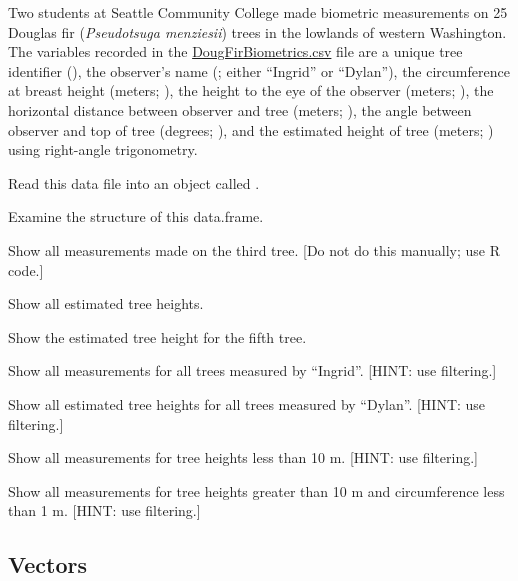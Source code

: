 \documentclass[10pt,openany]{book}\usepackage[]{graphicx}\usepackage[]{color}
\begin{document}
\begin{exsection}
  \item \label{revex:BasicsDataFrame1} \rhw{} Two students at Seattle Community College made biometric measurements on 25 Douglas fir (\emph{Pseudotsuga menziesii}) trees in the lowlands of western Washington.  The variables recorded in the \href{https://raw.githubusercontent.com/droglenc/NCData/master/DougFirBiometrics.csv}{DougFirBiometrics.csv} file are a unique tree identifier (), the observer's name (; either ``Ingrid'' or ``Dylan''), the circumference at breast height (meters; ), the height to the eye of the observer (meters; ), the horizontal distance between observer and tree (meters; ), the angle between observer and top of tree (degrees; ), and the estimated height of tree (meters; ) using right-angle trigonometry. 
  \begin{Enumerate}
    \item Read this data file into an object called .
    \item Examine the structure of this data.frame.
    \item Show all measurements made on the third tree. [Do not do this manually; use R code.]
    \item Show all estimated tree heights.
    \item Show the estimated tree height for the fifth tree.
    \item Show all measurements for all trees measured by ``Ingrid''.  [HINT: use filtering.]
    \item Show all estimated tree heights for all trees measured by ``Dylan''.  [HINT: use filtering.]
    \item Show all measurements for tree heights less than 10 m.  [HINT: use filtering.]
    \item Show all measurements for tree heights greater than 10 m and circumference less than 1 m.  [HINT: use filtering.]
  \end{Enumerate}
\end{exsection}

\vspace{-12pt}
\subsection{Vectors}  \label{sect:RVectors}
\vspace{-12pt}
\end{document}
